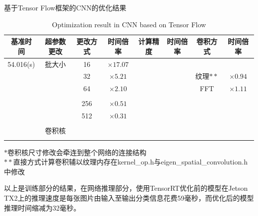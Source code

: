 \begin{table}
	\centering
	\renewcommand{\thetable}{\arabic{section}-\arabic{table} }
	\renewcommand{\tablename}{表}
	\caption{基于Tensor Flow框架的CNN的优化结果}
	\addtocounter{table}{-1}
	\renewcommand{\thetable}{\arabic{section}-\arabic{table} }
	\renewcommand{\tablename}{Table}
	\caption{Optimization result in CNN based on Tensor Flow}
	\begin{tabular}{cccccccc}
		\toprule
		基准时间 &  超参数更改 &更改方式 &时间倍率 & 计算精度 &时间倍率 & 卷积方式 &时间倍率 	\\
		\midrule
		54.016(s) & 批大小 & 16 & $ \times17.07 $ & \color[rgb]{0.3,0.4,1.0}{FP32} & \color[rgb]{0.3,0.4,1.0}{$ \times 1 $ } & \color[rgb]{0.3,0.4,1.0}{原始(GEMM)} &\color[rgb]{0.3,0.4,1.0}{$ \times 1 $} \\
		 & & 32 & $ \times 5.21 $ & \color[rgb]{0.9,0.7,0.01}{FP16} & \color[rgb]{0.9,0.7,0.01}{$ \times 0.86 $} & 纹理$ ** $ & $ \times 0.94 $\\
		 & & 64 & $ \times 2.10 $ & \color[rgb]{0.9,0.7,0.01}{INT8} & \color[rgb]{0.9,0.7,0.01}{$ \times 0.82 $} & FFT & $ \times 1.11 $\\
		 & & \color[rgb]{0.3,0.4,1.0}{128} & \color[rgb]{0.3,0.4,1.0}{$ \times 1 $}& & & & \\
		 & & 256 & $ \times 0.51 $ & & & & \\
		 & & 512 & $ \times 0.31 $ & & & & \\
		 & & \color[rgb]{0.9,0.7,0.01}{1024} & \color[rgb]{0.9,0.7,0.01}{$ \times 0.21 $}& & & & \\
		 & 卷积核 & \color[rgb]{0.3,0.4,1.0}{$ 5\times 5 $} & \color[rgb]{0.3,0.4,1.0}{$ \times 1 $} & & & & \\
		 & & \color{red}{$ 8\times 8 * $} & \color{red}{$ \times 0.97 $} & & & & \\
		\bottomrule
	\end{tabular} \label{table-TFRES} 
$ * $卷积核尺寸修改会牵连到整个网络的连接结构\\
$ ** $直接方式计算卷积辅以纹理内存在kernel\_op.h与eigen\_spatial\_convolution.h中修改
\end{table}
\par 以上是训练部分的结果，在网络推理部分，使用TensorRT优化前的模型在Jetson TX2上的推理速度是每张图片由输入至输出分类信息花费59毫秒，而优化后的模型推理时间缩减为32毫秒。
